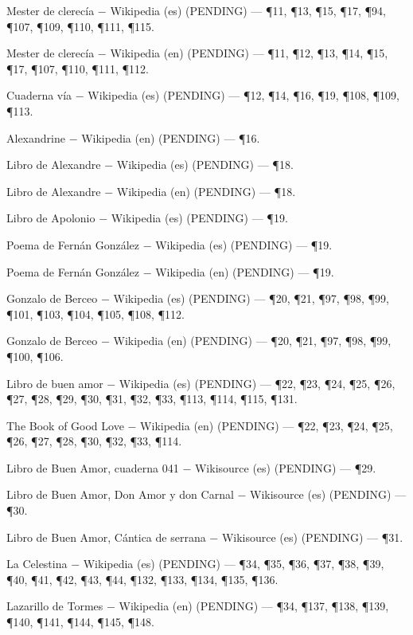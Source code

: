 \documentclass{book}
\begin{document}
\noindent Mester de clerecía \(-\) Wikipedia (es) (PENDING) --- \P11, \P13, \P15, \P17, \P94, \P107, \P109, \P110, \P111, \P115.

\noindent Mester de clerecía \(-\) Wikipedia (en) (PENDING) --- \P11, \P12, \P13, \P14, \P15, \P17, \P107, \P110, \P111, \P112.

\noindent Cuaderna vía \(-\) Wikipedia (es) (PENDING) --- \P12, \P14, \P16, \P19, \P108, \P109, \P113.

\noindent Alexandrine \(-\) Wikipedia (en) (PENDING) --- \P16.

\noindent Libro de Alexandre \(-\) Wikipedia (es) (PENDING) --- \P18.

\noindent Libro de Alexandre \(-\) Wikipedia (en) (PENDING) --- \P18.

\noindent Libro de Apolonio \(-\) Wikipedia (es) (PENDING) --- \P19.

\noindent Poema de Fernán González \(-\) Wikipedia (es) (PENDING) --- \P19.

\noindent Poema de Fernán González \(-\) Wikipedia (en) (PENDING) --- \P19.

\noindent Gonzalo de Berceo \(-\) Wikipedia (es) (PENDING) --- \P20, \P21, \P97, \P98, \P99, \P101, \P103, \P104, \P105, \P108, \P112.

\noindent Gonzalo de Berceo \(-\) Wikipedia (en) (PENDING) --- \P20, \P21, \P97, \P98, \P99, \P100, \P106.

\noindent Libro de buen amor \(-\) Wikipedia (es) (PENDING) --- \P22, \P23, \P24, \P25, \P26, \P27, \P28, \P29, \P30, \P31, \P32, \P33, \P113, \P114, \P115, \P131.

\noindent The Book of Good Love \(-\) Wikipedia (en) (PENDING) --- \P22, \P23, \P24, \P25, \P26, \P27, \P28, \P30, \P32, \P33, \P114.

\noindent Libro de Buen Amor, cuaderna 041 \(-\) Wikisource (es) (PENDING) --- \P29.

\noindent Libro de Buen Amor, Don Amor y don Carnal \(-\) Wikisource (es) (PENDING) --- \P30.

\noindent Libro de Buen Amor, Cántica de serrana \(-\) Wikisource (es) (PENDING) --- \P31.

\noindent La Celestina \(-\) Wikipedia (es) (PENDING) --- \P34, \P35, \P36, \P37, \P38, \P39, \P40, \P41, \P42, \P43, \P44, \P132, \P133, \P134, \P135, \P136.

\noindent Lazarillo de Tormes \(-\) Wikipedia (en) (PENDING) --- \P34, \P137, \P138, \P139, \P140, \P141, \P144, \P145, \P148.
\end{document}

